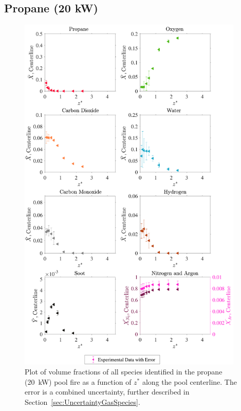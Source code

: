 \documentclass[12pt]{article}
\begin{document}
\subsection{Propane (20 kW)}
\label{ssec:Propane20kW_ALL_Vol_Frac}
\begin{figure}[!h]
	\centering
\includegraphics[width=10.75cm,keepaspectratio]{Propane 20KW_MOL_FRAC_Plot.pdf}
	\caption[Volume fractions of major species in the propane (20kW) plume]{Plot of volume fractions of all species identified in the propane (20~kW) pool fire as a function of $z^{*}$ along the pool centerline. The error is a combined uncertainty, further described in Section~\ref{sec:UncertaintyGasSpecies}.}
	\label{fig:Propane20kW_VOL_Frac_Major}
\end{figure}
\end{document}
